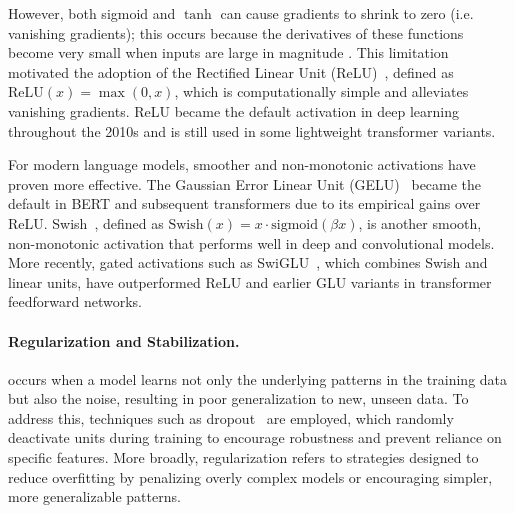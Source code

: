 However, both sigmoid and $\tanh$ can cause gradients to shrink to zero (i.e. vanishing gradients); this occurs because the derivatives of these functions become very small when inputs are large in magnitude \citet{glorot2010understanding}. This limitation motivated the adoption of the Rectified Linear Unit (ReLU)~\citep{nair2010rectified}, defined as $\mathrm{ReLU}(x) = \max(0, x)$, which is computationally simple and alleviates vanishing gradients. ReLU became the default activation in deep learning throughout the 2010s and is still used in some lightweight transformer variants. %

For modern language models, smoother and non-monotonic activations have proven more effective. The Gaussian Error Linear Unit (GELU)~\citep{hendrycks2016gaussian} became the default in BERT and subsequent transformers due to its empirical gains over ReLU. Swish~\citep{ramachandran2017searching}, defined as $\mathrm{Swish}(x) = x \cdot \mathrm{sigmoid}(\beta x)$, is another smooth, non-monotonic activation that performs well in deep and convolutional models. More recently, gated activations such as SwiGLU~\citep{shazeer2020glu}, which combines Swish and linear units, have outperformed ReLU and earlier GLU variants in transformer feedforward networks.

\paragraph{Regularization and Stabilization.}  occurs when a model learns not only the underlying patterns in the training data but also the noise, resulting in poor generalization to new, unseen data. To address this,  techniques such as dropout~\citep{srivastava2014dropout} are employed, which randomly deactivate units during training to encourage robustness and prevent reliance on specific features. More broadly, regularization refers to strategies designed to reduce overfitting by penalizing overly complex models or encouraging simpler, more generalizable patterns.

